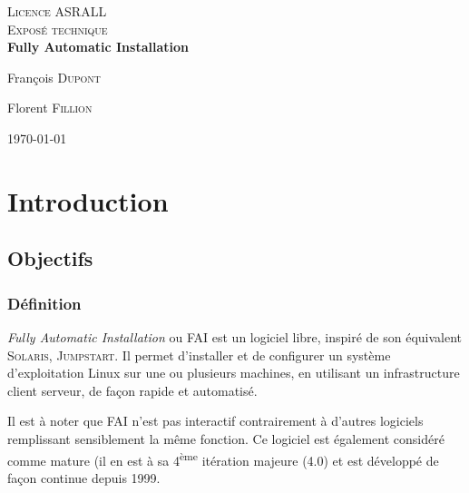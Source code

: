\documentclass[a4paper,12pt,one side,titlepage]{report}
\begin{document}
%
%


\begin{titlepage}
\begin{center}

\textsc{\LARGE Licence ASRALL}\\[1.5cm]

\textsc{\Large Exposé technique}\\[5.9cm]

{ \huge \bfseries Fully Automatic Installation\\[1.9cm] }

\noindent
\begin{minipage}{0.4\textwidth}
\begin{flushleft} \large
François \textsc{Dupont}
\end{flushleft}
\end{minipage}%
\begin{minipage}{0.4\textwidth}
\begin{flushright} \large
Florent \textsc{Fillion}
\end{flushright}
\end{minipage}

\vfill

{\large \today}

\end{center}
\end{titlepage}


\tableofcontents

\chapter{Introduction}
\section{Objectifs}
\subsection{Définition}
\textit{Fully Automatic Installation} ou \textsc{FAI} est un logiciel libre, inspiré de son équivalent \textsc{Solaris}, \textsc{Jumpstart}. Il permet d'installer et de configurer un système d'exploitation Linux sur une ou plusieurs machines, en utilisant un infrastructure client serveur, de façon rapide et automatisé.

Il est à noter que \textsc{FAI} n'est pas interactif contrairement à d'autres logiciels remplissant sensiblement la même fonction. Ce logiciel est également considéré comme mature (il en est à sa 4\textsuperscript{ème} itération majeure (4.0) et est développé de façon continue depuis 1999.
\end{document}
